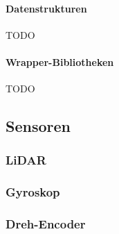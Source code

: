 \paragraph{Datenstrukturen}
TODO

\paragraph{Wrapper-Bibliotheken}
TODO

\subsection{Sensoren}
\label{subsec:ueberblick_sensors}

\subsubsection{LiDAR}
\label{subsec:ueberblick_lidar}

\subsubsection{Gyroskop}
\label{subsec:ueberblick_gyro}

\subsubsection{Dreh-Encoder}
\label{subsec:ueberblick_rot_enc}